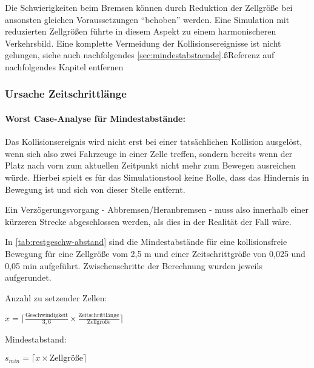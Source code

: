 Die Schwierigkeiten beim Bremsen können durch Reduktion der Zellgröße bei ansonsten gleichen Voraussetzungen \enquote{behoben} werden.
Eine Simulation mit reduzierten Zellgrößen führte in diesem Aspekt zu einem harmonischeren Verkehrsbild.
Eine komplette Vermeidung der Kollisionsereignisse ist nicht gelungen, siehe auch nachfolgendes \cref{sec:mindestabstaende}.\ss{Referenz auf nachfolgendes Kapitel entfernen}



\subsubsection{Ursache Zeitschrittlänge}

\paragraph*{Worst Case-Analyse für Mindestabstände:}
\label{sec:mindestabstaende}

Das Kollisionsereignis wird nicht erst bei einer tatsächlichen Kollision ausgelöst, wenn sich also zwei Fahrzeuge in einer Zelle treffen, sondern bereits wenn der Platz nach vorn zum aktuellen Zeitpunkt nicht mehr zum Bewegen ausreichen würde.
Hierbei spielt es für das Simulationstool keine Rolle, dass das Hindernis in Bewegung ist und sich von dieser Stelle entfernt.

Ein Verzögerungsvorgang - Abbremsen/Heranbremsen - muss also innerhalb einer kürzeren Strecke abgeschlossen werden, als dies in der Realität der Fall wäre.

In \cref{tab:restgeschw-abstand} sind die Mindestabstände für eine kollisionsfreie Bewegung für eine Zellgröße vom 2,5 m und einer Zeitschrittgröße von 0,025 und 0,05 min aufgeführt.
Zwischenschritte der Berechnung wurden jeweils aufgerundet.

\noindent
Anzahl zu setzender Zellen: 
\begin{center}
$ x = \lceil \frac{\text{Geschwindigkeit}}{3,6} \times \frac{\text{Zeitschrittlänge}}{\text{Zellgröße}} \rceil $
\end{center}
Mindestabstand: 
\begin{center}
$ s_{min} = \lceil x \times \text{Zellgröße} \rceil $
\end{center}

